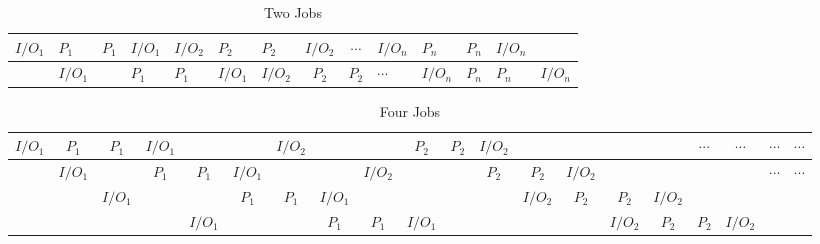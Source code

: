 \documentclass[12pt]{article}
\begin{document}
\begin{table}[h]
    \begin{tabular}{|l|l|l|l|l|l|l|c|c|l|l|l|l|l|}
    \hline
    $I/O_1$ & $P_1$   & $P_1$ & $I/O_1$ & $I/O_2$ & $P_2$   & $P_2$   & $I/O_2$ & $\cdots$ & $I/O_n$  & $P_n$   & $P_n$ & $I/O_n$ & ~       \\ \hline
    ~       & $I/O_1$ & ~     & $P_1$   & $P_1$   & $I/O_1$ & $I/O_2$ & $P_2$   & $P_2$    & $\cdots$ & $I/O_n$ & $P_n$ & $P_n$   & $I/O_n$ \\ \hline
    \end{tabular}
    \caption {Two Jobs}
\end{table}
		
		
\begin{table}[h]
    \begin{tabular}{|c|c|c|c|c|c|c|c|c|c|c|c|c|c|c|c|c|c|c|c|}
    \hline
    $I/O_1$ & $P_1$   & $P_1$   & $I/O_1$ & ~       & ~       & $I/O_2$ & ~       & ~       & $P_2$   & $P_2$ & $I/O_2$ & ~       & ~       & ~       & ~       & $\cdots$ & $\cdots$ & $\cdots$ & $\cdots$ \\ \hline
    ~       & $I/O_1$ & ~       & $P_1$   & $P_1$   & $I/O_1$ & ~       & ~       & $I/O_2$ & ~       & ~     & $P_2$   & $P_2$   & $I/O_2$ & ~       & ~       & ~        & ~        & $\cdots$ & $\cdots$ \\ \hline
    ~       & ~       & $I/O_1$ & ~       & ~       & $P_1$   & $P_1$    & $I/O_1$ & ~       & ~       & ~     & ~       & $I/O_2$ & $P_2$   & $P_2$   & $I/O_2$ & ~        & ~        & ~        & ~        \\ \hline
    ~       & ~       & ~       & ~       & $I/O_1$ & ~       & ~       & $P_1$   & $P_1$    & $I/O_1$ & ~     & ~       & ~       & ~       & $I/O_2$ & $P_2$   & $P_2$    & $I/O_2$  & ~        & ~        \\ \hline
    \end{tabular}
    \caption {Four Jobs}
\end{table}
\end{document}
